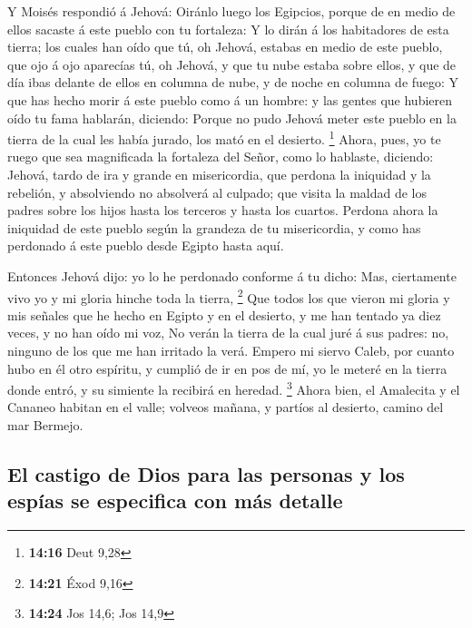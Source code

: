 Y Moisés respondió á Jehová: Oiránlo luego los Egipcios,
porque de en medio de ellos sacaste á este pueblo con tu fortaleza:
 Y lo dirán á los habitadores de esta tierra; los cuales
han oído que tú, oh Jehová, estabas en medio de este pueblo, que ojo á
ojo aparecías tú, oh Jehová, y que tu nube estaba sobre ellos, y que de
día ibas delante de ellos en columna de nube, y de noche en columna de
fuego:  Y que has hecho morir á este pueblo como á un
hombre: y las gentes que hubieren oído tu fama hablarán, diciendo:
 Porque no pudo Jehová meter este pueblo en la tierra de la
cual les había jurado, los mató en el desierto. \footnote{\textbf{14:16}
  Deut 9,28}  Ahora, pues, yo te ruego que sea magnificada
la fortaleza del Señor, como lo hablaste, diciendo: 
Jehová, tardo de ira y grande en misericordia, que perdona la iniquidad
y la rebelión, y absolviendo no absolverá al culpado; que visita la
maldad de los padres sobre los hijos hasta los terceros y hasta los
cuartos.  Perdona ahora la iniquidad de este pueblo según
la grandeza de tu misericordia, y como has perdonado á este pueblo desde
Egipto hasta aquí.

 Entonces Jehová dijo: yo lo he perdonado conforme á tu
dicho:  Mas, ciertamente vivo yo y mi gloria hinche toda la
tierra, \footnote{\textbf{14:21} Éxod 9,16}  Que todos los
que vieron mi gloria y mis señales que he hecho en Egipto y en el
desierto, y me han tentado ya diez veces, y no han oído mi voz,
 No verán la tierra de la cual juré á sus padres: no,
ninguno de los que me han irritado la verá.  Empero mi
siervo Caleb, por cuanto hubo en él otro espíritu, y cumplió de ir en
pos de mí, yo le meteré en la tierra donde entró, y su simiente la
recibirá en heredad. \footnote{\textbf{14:24} Jos 14,6; Jos 14,9}
 Ahora bien, el Amalecita y el Cananeo habitan en el valle;
volveos mañana, y partíos al desierto, camino del mar Bermejo.

\hypertarget{el-castigo-de-dios-para-las-personas-y-los-espuxedas-se-especifica-con-muxe1s-detalle}{%
\subsection{El castigo de Dios para las personas y los espías se
especifica con más
detalle}\label{el-castigo-de-dios-para-las-personas-y-los-espuxedas-se-especifica-con-muxe1s-detalle}}

